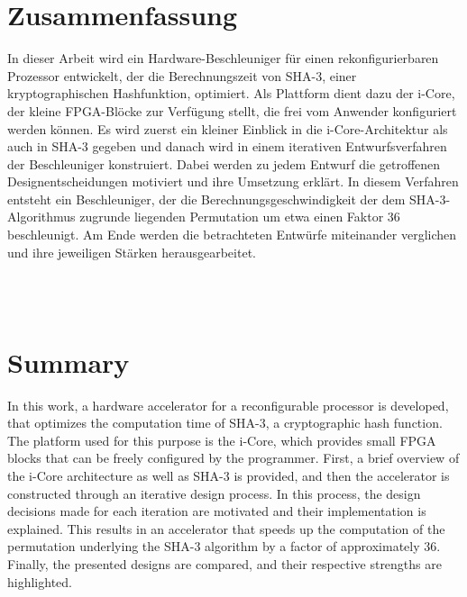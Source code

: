 
\section*{Zusammenfassung}
In dieser Arbeit wird ein Hardware-Beschleuniger für einen rekonfigurierbaren Prozessor entwickelt, der die Berechnungszeit
von SHA-3, einer kryptographischen Hashfunktion, optimiert. Als Plattform dient dazu der i-Core, der kleine FPGA-Blöcke
zur Verfügung stellt, die frei vom Anwender konfiguriert werden können. Es wird zuerst ein kleiner Einblick in
die i-Core-Architektur als auch in SHA-3 gegeben und danach wird in einem iterativen Entwurfsverfahren der Beschleuniger konstruiert.
Dabei werden zu jedem Entwurf die getroffenen Designentscheidungen motiviert und ihre Umsetzung erklärt. In diesem Verfahren entsteht
ein Beschleuniger, der die Berechnungsgeschwindigkeit der dem SHA-3-Algorithmus zugrunde liegenden Permutation um etwa einen Faktor 36 beschleunigt.
Am Ende werden die betrachteten Entwürfe miteinander verglichen und ihre jeweiligen Stärken herausgearbeitet.


~\\
~\\
\section*{Summary}
In this work, a hardware accelerator for a reconfigurable processor is developed, that optimizes the computation time of SHA-3,
a cryptographic hash function. The platform used for this purpose is the i-Core, which provides small FPGA blocks that
can be freely configured by the programmer. First, a brief overview of the i-Core architecture as well as SHA-3 is provided,
and then the accelerator is constructed through an iterative design process. In this process, the design decisions
made for each iteration are motivated and their implementation is explained. This results in an accelerator that speeds
up the computation of the permutation underlying the SHA-3 algorithm by a factor of approximately 36. Finally,
the presented designs are compared, and their respective strengths are highlighted.
